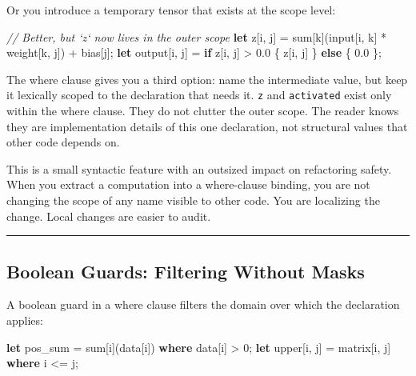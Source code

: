\documentclass[11pt,]{article}
\newenvironment{Shaded}{}{}
\newcommand{\CommentTok}[1]{\textcolor[rgb]{0.38,0.63,0.69}{\textit{#1}}}
\newcommand{\DecValTok}[1]{\textcolor[rgb]{0.25,0.63,0.44}{#1}}
\newcommand{\KeywordTok}[1]{\textcolor[rgb]{0.00,0.44,0.13}{\textbf{#1}}}
\newcommand{\NormalTok}[1]{#1}
\newcommand{\OperatorTok}[1]{\textcolor[rgb]{0.40,0.40,0.40}{#1}}
\begin{document}
Or you introduce a temporary tensor that exists at the scope level:

\begin{Shaded}
\begin{Highlighting}[]
\CommentTok{// Better, but `z` now lives in the outer scope}
\KeywordTok{let}\NormalTok{ z}\OperatorTok{[}\NormalTok{i, j}\OperatorTok{]}\NormalTok{ = sum}\OperatorTok{[}\NormalTok{k}\OperatorTok{]}\NormalTok{(input}\OperatorTok{[}\NormalTok{i, k}\OperatorTok{]}\NormalTok{ * weight}\OperatorTok{[}\NormalTok{k, j}\OperatorTok{]}\NormalTok{) + bias}\OperatorTok{[}\NormalTok{j}\OperatorTok{]}\NormalTok{;}
\KeywordTok{let}\NormalTok{ output}\OperatorTok{[}\NormalTok{i, j}\OperatorTok{]}\NormalTok{ = }\KeywordTok{if}\NormalTok{ z}\OperatorTok{[}\NormalTok{i, j}\OperatorTok{]}\NormalTok{ > }\DecValTok{0.0} \OperatorTok{\{}\NormalTok{ z}\OperatorTok{[}\NormalTok{i, j}\OperatorTok{]} \OperatorTok{\}} \KeywordTok{else} \OperatorTok{\{} \DecValTok{0.0} \OperatorTok{\}}\NormalTok{;}
\end{Highlighting}
\end{Shaded}

The where clause gives you a third option: name the intermediate value,
but keep it lexically scoped to the declaration that needs it.
\texttt{z} and \texttt{activated} exist only within the where clause.
They do not clutter the outer scope. The reader knows they are
implementation details of this one declaration, not structural values
that other code depends on.

This is a small syntactic feature with an outsized impact on refactoring
safety. When you extract a computation into a where-clause binding, you
are not changing the scope of any name visible to other code. You are
localizing the change. Local changes are easier to audit.

\begin{center}\rule{0.5\linewidth}{0.4pt}\end{center}

\hypertarget{boolean-guards-filtering-without-masks}{%
\subsection{Boolean Guards: Filtering Without
Masks}\label{boolean-guards-filtering-without-masks}}

A boolean guard in a where clause filters the domain over which the
declaration applies:

\begin{Shaded}
\begin{Highlighting}[]
\KeywordTok{let}\NormalTok{ pos_sum = sum}\OperatorTok{[}\NormalTok{i}\OperatorTok{]}\NormalTok{(data}\OperatorTok{[}\NormalTok{i}\OperatorTok{]}\NormalTok{) }\KeywordTok{where}\NormalTok{ data}\OperatorTok{[}\NormalTok{i}\OperatorTok{]}\NormalTok{ > }\DecValTok{0}\NormalTok{;}
\KeywordTok{let}\NormalTok{ upper}\OperatorTok{[}\NormalTok{i, j}\OperatorTok{]}\NormalTok{ = matrix}\OperatorTok{[}\NormalTok{i, j}\OperatorTok{]} \KeywordTok{where}\NormalTok{ i <= j;}
\end{Highlighting}
\end{Shaded}
\end{document}
